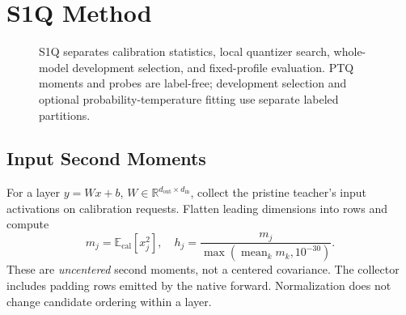 \documentclass[10pt,twocolumn]{article}
\newcommand{\E}{\mathbb E}
\newcommand{\R}{\mathbb R}
\begin{document}
\section{S1Q Method}
\begin{figure}[t]
\centering
{}
\caption{S1Q separates calibration statistics, local quantizer search,
whole-model development selection, and fixed-profile evaluation.
PTQ moments and probes are label-free; development selection and
optional probability-temperature fitting use separate labeled partitions.}
\label{fig:pipeline}
\end{figure}

\subsection{Input Second Moments}
For a layer $y=Wx+b$, $W\in\R^{d_{\mathrm{out}}\times d_{\mathrm{in}}}$,
collect the pristine teacher's input activations on calibration requests.
Flatten leading dimensions into rows and compute
\begin{equation}
 m_j=\E_{\mathrm{cal}}[x_j^2],\quad
 h_j=\frac{m_j}{\max(\operatorname{mean}_k m_k,10^{-30})}.
 \label{eq:input}
\end{equation}
These are \emph{uncentered} second moments, not a centered covariance.
The collector includes padding rows emitted by the native forward.
Normalization does not change candidate ordering within a layer.
\end{document}
